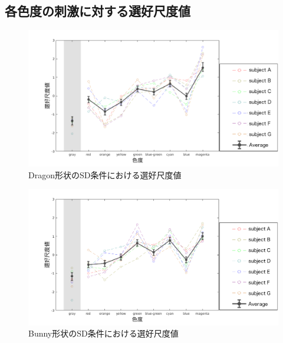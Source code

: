         \newpage
        \subsection{各色度の刺激に対する選好尺度値}
            
            \begin{figure}[h]
                \centering
                \includegraphics[width=15.0cm]{./img/ex1_res_DSD_p.png}
                \caption{Dragon形状のSD条件における選好尺度値}
                \label{ex1_DSD}
            \end{figure}

            \begin{figure}[h]
                \centering
                \includegraphics[width=15.0cm]{./img/ex1_res_BSD_p.png}
                \caption{Bunny形状のSD条件における選好尺度値}
                \label{ex1_BSD}
            \end{figure}
            
